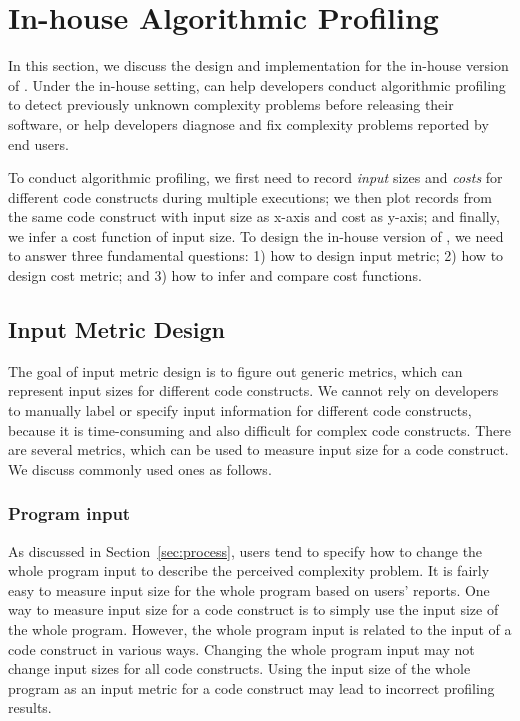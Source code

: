 
\newpage
\section{In-house Algorithmic Profiling}
\label{sec:inhouse}

In this section, we discuss the design and implementation for the in-house version of \Tool.
Under the in-house setting, 
\Tool can help developers conduct algorithmic profiling to detect 
previously unknown complexity problems before releasing their software, 
or help developers diagnose and fix complexity problems reported by end users. 

To conduct algorithmic profiling,
we first need to record \textit{input} sizes and \textit{costs} for different code constructs 
during multiple executions;
we then plot records from the same code construct with input size as x-axis and cost as y-axis; 
and finally, we infer a cost function of input size.
To design the in-house version of \Tool, 
we need to answer three fundamental questions:
1) how to design input metric; 
2) how to design cost metric;
and 3) how to infer and compare cost functions. 


\subsection{Input Metric Design}
\label{sec:input}

The goal of input metric design is to figure out generic metrics, 
which can represent input sizes for different code constructs. 
We cannot rely on developers to manually label or specify input information 
for different code constructs, 
because it is time-consuming and also difficult for complex code constructs.  
There are several metrics, which can be used to measure input size for a code construct.
We discuss commonly used ones as follows. 

\subsubsection{Program input}
As discussed in Section~\ref{sec:process}, 
users tend to specify how to change the whole program 
input to describe the perceived complexity problem.
It is fairly easy to measure input size for the whole program based on users' reports.
One way to measure input size for a code construct
is to simply use the input size of the whole program. 
However, the whole program input 
is related to the input of a code construct in various ways.
Changing the whole program input may not change input sizes for 
all code constructs. 
Using the input size of the whole program as an input metric for a code 
construct may lead to incorrect profiling results. 


